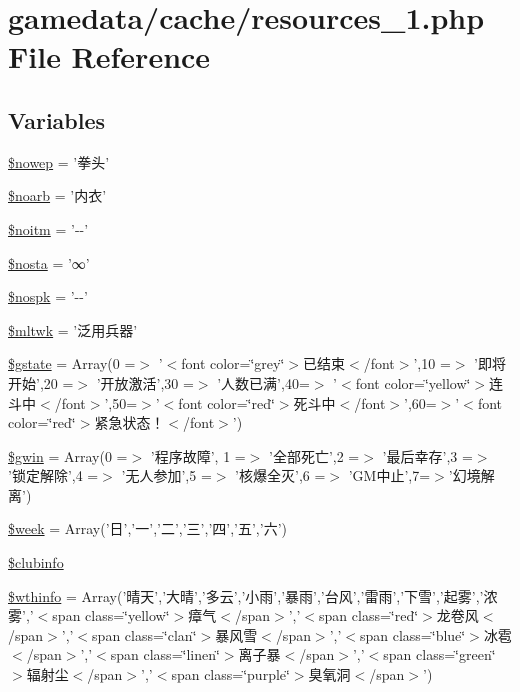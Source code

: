 \hypertarget{cache_2resources__1_8php}{\section{gamedata/cache/resources\+\_\+1.php File Reference}
\label{cache_2resources__1_8php}
}
\subsection*{Variables}
\begin{DoxyCompactItemize}
\item 
\hyperlink{cache_2resources__1_8php_a413d4ee11837afa83d33b1cd34244911}{\$nowep} = '拳头'
\item 
\hyperlink{cache_2resources__1_8php_a7042f4c981c7c1dd023648a96ee9a456}{\$noarb} = '内衣'
\item 
\hyperlink{cache_2resources__1_8php_ad51c71e4cc6cd78c709454b5f2a2f84c}{\$noitm} = '-\/-\/'
\item 
\hyperlink{cache_2resources__1_8php_a1b178dce2c8c7c1f35b20c828d51de4a}{\$nosta} = '∞'
\item 
\hyperlink{cache_2resources__1_8php_a472cdfe07d9d5ca35696f2aa6848fd0c}{\$nospk} = '-\/-\/'
\item 
\hyperlink{cache_2resources__1_8php_af12f55cfe5805f1081499f04e700478a}{\$mltwk} = '泛用兵器'
\item 
\hyperlink{cache_2resources__1_8php_a5aed3a3ce44a1f7125854d31c7f61a6b}{\$gstate} = Array(0 =$>$ '$<$font color=\char`\"{}grey\char`\"{}$>$已结束$<$/font$>$',10 =$>$ '即将开始',20 =$>$ '开放激活',30 =$>$ '人数已满',40=$>$ '$<$font color=\char`\"{}yellow\char`\"{}$>$连斗中$<$/font$>$',50=$>$'$<$font color=\char`\"{}red\char`\"{}$>$死斗中$<$/font$>$',60=$>$'$<$font color=\char`\"{}red\char`\"{}$>$紧急状态！$<$/font$>$')
\item 
\hyperlink{cache_2resources__1_8php_a2957a034129d3598a5d35640b8906532}{\$gwin} = Array(0 =$>$ '程序故障', 1 =$>$ '全部死亡',2 =$>$ '最后幸存',3 =$>$ '锁定解除',4 =$>$ '无人参加',5 =$>$ '核爆全灭',6 =$>$ 'G\+M中止',7=$>$'幻境解离')
\item 
\hyperlink{cache_2resources__1_8php_ad51e8a8cd3d4faaf3cb8e8b75dea029f}{\$week} = Array('日','一','二','三','四','五','六')
\item 
\hyperlink{cache_2resources__1_8php_a8b3df41376c3d0f32c94cad94b494ce0}{\$clubinfo}
\item 
\hyperlink{cache_2resources__1_8php_a42c20343a70aaec3fcdbace0179e4eb2}{\$wthinfo} = Array('晴天','大晴','多云','小雨','暴雨','台风','雷雨','下雪','起雾','浓雾','$<$span class=\char`\"{}yellow\char`\"{}$>$瘴气$<$/span$>$','$<$span class=\char`\"{}red\char`\"{}$>$龙卷风$<$/span$>$','$<$span class=\char`\"{}clan\char`\"{}$>$暴风雪$<$/span$>$','$<$span class=\char`\"{}blue\char`\"{}$>$冰雹$<$/span$>$','$<$span class=\char`\"{}linen\char`\"{}$>$离子暴$<$/span$>$','$<$span class=\char`\"{}green\char`\"{}$>$辐射尘$<$/span$>$','$<$span class=\char`\"{}purple\char`\"{}$>$臭氧洞$<$/span$>$')

\end{DoxyCompactItemize}
